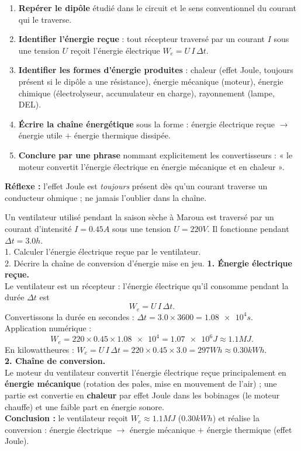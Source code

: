 \documentclass[11pt]{article}
\newcommand{\cle}[1]{{\popxbold\color{popdark}#1}}
\begin{document}
\begin{methode}
\begin{enumerate}
\item \textbf{Repérer le dipôle} étudié dans le circuit et le sens conventionnel du courant qui le traverse.
\item \textbf{Identifier l'énergie reçue} : tout récepteur traversé par un courant $I$ sous une tension $U$ reçoit l'énergie électrique $W_e = U\,I\,\Delta t$.
\item \textbf{Identifier les formes d'énergie produites} : chaleur (effet Joule, \cle{toujours présent} si le dipôle a une résistance), énergie mécanique (moteur), énergie chimique (électrolyseur, accumulateur en charge), rayonnement (lampe, DEL).
\item \textbf{Écrire la chaîne énergétique} sous la forme : énergie électrique reçue $\to$ énergie utile $+$ énergie thermique dissipée.
\item \textbf{Conclure par une phrase} nommant explicitement les convertisseurs : « le moteur convertit l'énergie électrique en énergie mécanique et en chaleur ».
\end{enumerate}
\textbf{Réflexe :} l'effet Joule est \emph{toujours} présent dès qu'un courant traverse un conducteur ohmique ; ne jamais l'oublier dans la chaîne.
\end{methode}

\begin{exoresolu}
Un ventilateur utilisé pendant la saison sèche à Maroua est traversé par un courant d'intensité $I = \num{0,45}{A}$ sous une tension $U = \num{220}{V}$. Il fonctionne pendant $\Delta t = \num{3,0}{h}$.\\
1. Calculer l'énergie électrique reçue par le ventilateur.\\
2. Décrire la chaîne de conversion d'énergie mise en jeu.
\tcblower
\textbf{1. Énergie électrique reçue.}\\
Le ventilateur est un récepteur : l'énergie électrique qu'il consomme pendant la durée $\Delta t$ est
\[ W_e = U\,I\,\Delta t. \]
Convertissons la durée en secondes : $\Delta t = \num{3,0} \times \num{3600} = \num{1,08e4}{s}$.\\
Application numérique :
\[ W_e = 220 \times \num{0,45} \times \num{1,08e4} = \num{1,07e6}{J} \approx \num{1,1}{MJ}. \]
En kilowattheures : $W_e = U\,I\,\Delta t = 220 \times \num{0,45} \times \num{3,0} = \num{297}{Wh} \approx \num{0,30}{kWh}$.\\
\textbf{2. Chaîne de conversion.}\\
Le moteur du ventilateur convertit l'énergie électrique reçue principalement en \textbf{énergie mécanique} (rotation des pales, mise en mouvement de l'air) ; une partie est convertie en \textbf{chaleur} par effet Joule dans les bobinages (le moteur chauffe) et une faible part en énergie sonore.\\
\textbf{Conclusion :} le ventilateur reçoit $W_e \approx \num{1,1}{MJ}$ ($\num{0,30}{kWh}$) et réalise la conversion : énergie électrique $\to$ énergie mécanique $+$ énergie thermique (effet Joule).
\end{exoresolu}
\end{document}
